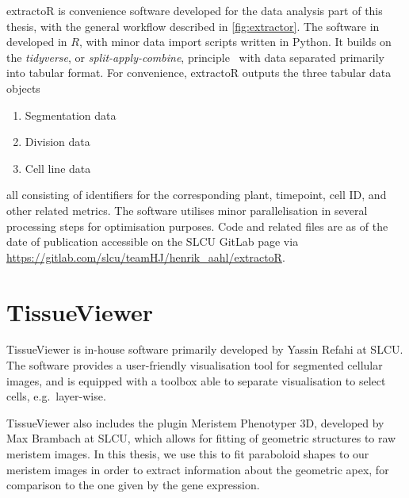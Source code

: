 extractoR is convenience software developed for the data analysis part of this
thesis, with the general workflow described in \cref{fig:extractor}. The
software in developed in $R$, with minor data import scripts written in Python.
It builds on the \textit{tidyverse}, or \textit{split-apply-combine},
principle~\cite{wickham2011split} with data separated primarily into tabular
format. For convenience, extractoR
outputs the three  tabular data objects  
\begin{enumerate}
  \item Segmentation data
  \item Division data
  \item Cell line data
\end{enumerate}
all consisting of identifiers for the corresponding plant, timepoint, cell ID,
and other related metrics. The software utilises minor parallelisation in
several processing steps for optimisation purposes.
Code and related files are as of the date of
publication accessible on the SLCU GitLab page via 
\url{https://gitlab.com/slcu/teamHJ/henrik_aahl/extractoR}.

\section{TissueViewer}
\label{sec:tissueviewer}
TissueViewer is in-house software primarily developed by Yassin Refahi at SLCU. The
software provides a user-friendly visualisation tool for segmented cellular
images, and is equipped with a toolbox able to separate visualisation to select
cells, e.g.\ layer-wise. 

TissueViewer also includes the plugin Meristem Phenotyper 3D, developed by Max
Brambach at SLCU, which allows for fitting of geometric structures to raw
meristem images. In this thesis, we use this to fit paraboloid shapes to our
meristem images in order to extract information about the geometric apex, for
comparison to the one given by the gene expression.
